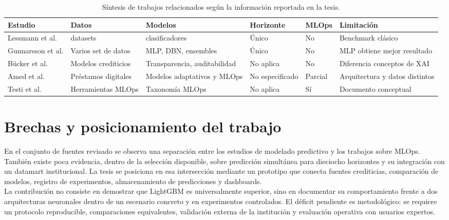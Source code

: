 \begin{table}[h!]
    \centering
    \small
    \begin{tabular}{
        | >{\raggedright\arraybackslash}p{2.0cm}
        | >{\raggedright\arraybackslash}p{2.5cm}
        | >{\raggedright\arraybackslash}p{2.5cm}
        | >{\raggedright\arraybackslash}p{2.0cm}
        | >{\centering\arraybackslash}p{1.5cm}
        | >{\raggedright\arraybackslash}p{3.0cm} |        
        }
        \hline
            \textbf{Estudio} & \textbf{Datos} & \textbf{Modelos} & \textbf{Horizonte} & \textbf{MLOps} & \textbf{Limitación} \\
        \hline
            Lessmann et al. \cite{lessmann2015benchmarking} &  8 datasets & 41 clasificadores & Único & No & Benchmark clásico \\
        \hline
            Gunnarsson et al. \cite{gunnarsson2021deep} & Varios set de datos & MLP, DBN, ensembles & Único & No & MLP obtiene mejor resultado \\
        \hline
            Bücker et al. \cite{bucker2022transparency} & Modelos crediticios & Transparencia, auditabilidad & No aplica & No & Diferencia conceptos de XAI \\
        \hline
            Amed et al. \cite{testi2022mlops} & Préstamos digitales & Modelos adaptativos y MLOps & No especificado & Parcial & Arquitectura y datos distintos \\
        \hline
            Testi et al. \cite{testi2022mlops} & Herramientas MLOps & Taxonomía MLOps & No aplica & Sí & Documento conceptual \\
        \hline
    \end{tabular}
    \caption{Síntesis de trabajos relacionados según la información reportada en la tesis.}
    \label{tab:sintesis_literatura}
\end{table}

\section{Brechas y posicionamiento del trabajo}

En el conjunto de fuentes revisado se observa una separación entre los estudios de modelado predictivo y los trabajos sobre MLOps. También existe poca evidencia, dentro de la selección disponible, sobre predicción simultánea para dieciocho horizontes y su integración con un datamart institucional. La tesis se posiciona en esa intersección mediante un prototipo que conecta fuentes crediticias, comparación de modelos, registro de experimentos, almacenamiento de predicciones y dashboards.\\

La contribución no consiste en demostrar que LightGBM es universalmente superior, sino en documentar su comportamiento frente a dos arquitecturas neuronales dentro de un escenario concreto y en experimentos controlados. El déficit pendiente es metodológico: se requiere un protocolo reproducible, comparaciones equivalentes, validación externa de la institución y evaluación operativa con usuarios expertos.
